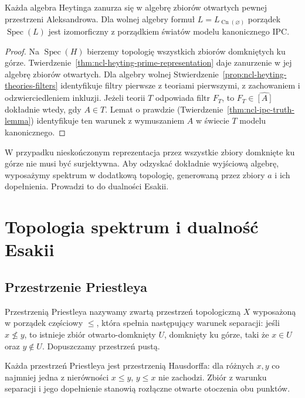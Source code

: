 \begin{wniosek}
\label{cor:ncl-heyting-prime-topological}
Każda algebra Heytinga zanurza się w algebrę
zbiorów otwartych pewnej przestrzeni Aleksandrowa.
Dla wolnej algebry formuł
$L=L_{\operatorname{Cn}(\varnothing)}$
porządek $\operatorname{Spec}(L)$ jest izomorficzny
z porządkiem światów modelu kanonicznego IPC.
\end{wniosek}
\begin{proof}
Na $\operatorname{Spec}(H)$ bierzemy topologię
wszystkich zbiorów domkniętych ku górze.
Twierdzenie~\ref{thm:ncl-heyting-prime-representation}
daje zanurzenie w jej algebrę zbiorów otwartych.
Dla algebry wolnej
Stwierdzenie~\ref{prop:ncl-heyting-theories-filters}
identyfikuje filtry pierwsze z teoriami pierwszymi,
z zachowaniem i odzwierciedleniem inkluzji.
Jeżeli teorii $T$ odpowiada filtr $F_T$,
to $F_T\in\widehat{[A]}$ dokładnie wtedy,
gdy $A\in T$. Lemat o prawdzie
(Twierdzenie~\ref{thm:ncl-ipc-truth-lemma})
identyfikuje ten warunek z wymuszaniem $A$
w świecie $T$ modelu kanonicznego.
\end{proof}

W przypadku nieskończonym reprezentacja przez
wszystkie zbiory domknięte ku górze nie musi być
surjektywna. Aby odzyskać dokładnie wyjściową
algebrę, wyposażymy spektrum w dodatkową topologię,
generowaną przez zbiory $\widehat a$ i ich
dopełnienia. Prowadzi to do dualności Esakii.

\section{Topologia spektrum i dualność Esakii}

\subsection{Przestrzenie Priestleya}

\begin{definicja}
\label{def:ncl-heyting-priestley}
Przestrzenią Priestleya nazywamy zwartą przestrzeń
topologiczną $X$ wyposażoną w porządek częściowy
$\leq$, która spełnia następujący warunek separacji:
jeśli $x\not\leq y$, to istnieje zbiór
otwarto-domknięty $U$, domknięty ku górze,
taki że $x\in U$ oraz $y\notin U$.
Dopuszczamy przestrzeń pustą.
\end{definicja}
Każda przestrzeń Priestleya jest przestrzenią
Hausdorffa: dla różnych $x,y$ co najmniej jedna
z nierówności $x\leq y$, $y\leq x$ nie zachodzi.
Zbiór z warunku separacji i jego dopełnienie
stanowią rozłączne otwarte otoczenia obu punktów.

